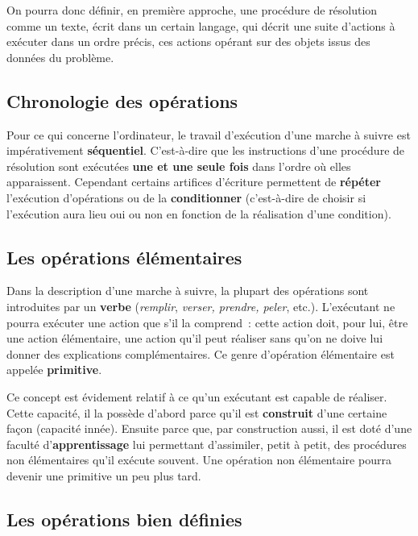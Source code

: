 		On pourra donc définir, en première approche, 
		une procédure de résolution comme un texte, 
		écrit dans un certain langage, 
		qui décrit une suite d’actions à exécuter dans un ordre précis, 
		ces actions opérant sur des objets issus des données du problème.
	
		\subsection{Chronologie des opérations}
		
			Pour ce qui concerne l’ordinateur, 
			le travail d’exécution d’une marche à suivre 
			est impérativement \textbf{séquentiel}. 
			C’est-à-dire que les instructions d’une procédure de résolution 
			sont exécutées \textbf{une et une seule fois} 
			dans l’ordre où elles apparaissent.
			Cependant certains artifices d’écriture 
			permettent de \textbf{répéter} l’exécution d’opérations 
			ou de la \textbf{conditionner}
			(c’est-à-dire de choisir si l’exécution aura lieu oui ou non 
			en fonction de la réalisation d’une condition).
	
		\subsection{Les opérations élémentaires}
		
			Dans la description d’une marche à suivre, 
			la plupart des opérations sont introduites par un \textbf{verbe}
			(\textit{remplir}, \textit{verser, prendre, peler}, etc.). 
			L’exécutant ne pourra exécuter une action que s’il la comprend~:
			cette action doit, pour lui, être une action élémentaire, 
			une action qu’il peut réaliser 
			sans qu’on ne doive lui donner des explications complémentaires. 
			Ce genre d’opération élémentaire est appelée \textbf{primitive}.
			
			Ce concept est évidement relatif 
			à ce qu’un exécutant est capable de réaliser. 
			Cette capacité, il la possède d’abord 
			parce qu’il est \textbf{construit} d’une certaine façon 
			(capacité innée). 
			Ensuite parce que, par construction aussi, 
			il est doté d’une faculté d’\textbf{apprentissage} 
			lui permettant d’assimiler, petit à petit, 
			des procédures non élémentaires qu’il exécute souvent. 
			Une opération non élémentaire 
			pourra devenir une primitive un peu plus tard.
			
		\subsection{Les opérations bien définies}
		

